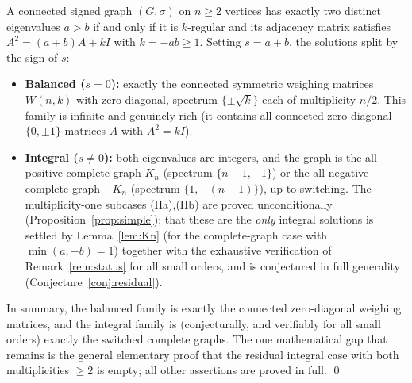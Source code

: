 \documentclass{amsart}
\theoremstyle{definition}
\begin{document}
A connected signed graph $(G,\sigma)$ on $n\ge2$ vertices has exactly two
distinct eigenvalues $a>b$ if and only if it is $k$-regular and its adjacency
matrix satisfies $A^2=(a+b)A+kI$ with $k=-ab\ge1$. Setting $s=a+b$, the
solutions split by the sign of $s$:
\begin{itemize}
\item \textbf{Balanced ($s=0$):} exactly the connected symmetric weighing
matrices $W(n,k)$ with zero diagonal, spectrum $\{\pm\sqrt k\}$ each of
multiplicity $n/2$. This family is infinite and genuinely rich (it contains all
connected zero-diagonal $\{0,\pm1\}$ matrices $A$ with $A^2=kI$).
\item \textbf{Integral ($s\ne0$):} both eigenvalues are integers, and the
graph is the all-positive complete graph $K_n$ (spectrum $\{n-1,-1\}$) or the
all-negative complete graph $-K_n$ (spectrum $\{1,-(n-1)\}$), up to switching.
The multiplicity-one subcases (IIa),(IIb) are proved unconditionally
(Proposition~\ref{prop:simple}); that these are the \emph{only} integral
solutions is settled by Lemma~\ref{lem:Kn} (for the complete-graph case with
$\min(a,-b)=1$) together with the exhaustive verification of
Remark~\ref{rem:status} for all small orders, and is conjectured in full
generality (Conjecture~\ref{conj:residual}).
\end{itemize}

In summary, the balanced family is exactly the connected zero-diagonal weighing
matrices, and the integral family is (conjecturally, and verifiably for all
small orders) exactly the switched complete graphs. The one mathematical gap
that remains is the general elementary proof that the residual integral case
with both multiplicities $\ge2$ is empty; all other assertions are proved in
full.
\qed
\end{document}

